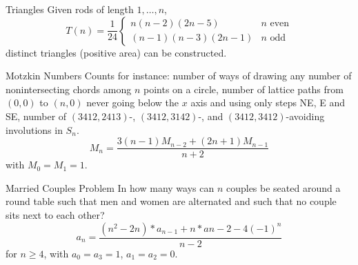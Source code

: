\begin{algorithm}{Triangles}
\desc
Given rods of length $1, \ldots, n$, 
$$
T(n) = \frac{1}{24}\left\{\begin{array}{ll}
n(n-2)(2n-5) & \textrm{$n$ even}\\
(n-1)(n-3)(2n-1) & \textrm{$n$ odd}
\end{array}\right.$$
distinct triangles (positive area) can be constructed.
\end{algorithm}

\begin{algorithm}{Motzkin Numbers}
\desc
Counts for instance: number of ways of drawing any number of
nonintersecting chords among $n$ points on a circle, number of lattice
paths from $(0,0)$ to $(n,0)$ never going below the $x$ axis and using
only steps NE, E and SE, number of $(3412,2413)$-, $(3412,3142)$-, and
$(3412,3412)$-avoiding involutions in $S_n$.
$$
M_n = \frac{3(n-1)M_{n-2} + (2n+1)M_{n-1}}{n+2}
$$
with $M_0 = M_1 = 1$.
\end{algorithm}

\begin{algorithm}{Married Couples Problem}
\desc
In how many ways can $n$ couples be seated around a round table such
that men and women are alternated and such that no couple sits next to
each other?
$$a_n = \frac{(n^2-2n)*a_{n-1} + n*a{n-2} - 4(-1)^n}{n-2}$$
for $n \ge 4$, with $a_0 = a_3 = 1$, $a_1 = a_2 = 0$.

\end{algorithm}